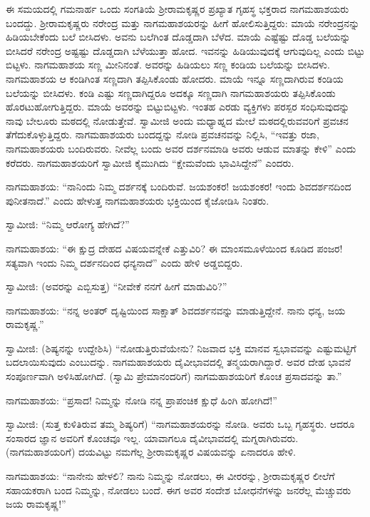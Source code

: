  ಈ ಸಮಯದಲ್ಲಿ ಗಮನಾರ್ಹ ಒಂದು ಸಂಗತಿಯೆ ಶ‍್ರೀರಾಮಕೃಷ್ಣರ ಪ್ರಖ್ಯಾತ ಗೃಹಸ್ಥ ಭಕ್ತರಾದ ನಾಗಮಹಾಶಯರು ಬಂದದ್ದು. ಶ‍್ರೀರಾಮಕೃಷ್ಣರು ನರೇಂದ್ರ ಮತ್ತು ನಾಗಮಹಾಶಯರನ್ನು ಹೀಗೆ ಹೋಲಿಸುತ್ತಿದ್ದರು: ಮಾಯೆ ನರೇಂದ್ರನನ್ನು ಹಿಡಿಯಬೇಕೆಂದು ಬಲೆ ಬೀಸಿದಳು. ಅವನು ಬಲೆಗಿಂತ ದೊಡ್ಡದಾಗಿ ಬೆಳೆದ. ಮಾಯೆ ಎಷ್ಟೆಷ್ಟು ದೊಡ್ಡ ಬಲೆಯನ್ನು ಬೀಸಿದರೆ ನರೇಂದ್ರ ಅಷ್ಟಷ್ಟು ದೊಡ್ಡದಾಗಿ ಬೆಳೆಯುತ್ತಾ ಹೋದ. ಇವನನ್ನು ಹಿಡಿಯುವುದಕ್ಕೆ ಆಗುವುದಿಲ್ಲ ಎಂದು ಬಿಟ್ಟು ಬಿಟ್ಟಳು. ನಾಗಮಹಾಶಯ ಸಣ್ಣ ಮೀನಿನಂತೆ. ಅವರನ್ನು ಹಿಡಿಯಲು ಸಣ್ಣ ಕಂಡಿಯ ಬಲೆಯನ್ನು ಬೀಸಿದಳು. ನಾಗಮಹಾಶಯ ಆ ಕಂಡಿಗಿಂತ ಸಣ್ಣದಾಗಿ ತಪ್ಪಿಸಿಕೊಂಡು ಹೋದರು. ಮಾಯೆ ಇನ್ನೂ ಸಣ್ಣದಾಗಿರುವ ಕಂಡಿಯ ಬಲೆಯನ್ನು ಬೀಸಿದಳು. ಕಂಡಿ ಎಷ್ಟು ಸಣ್ಣದಾಗಿದ್ದರೂ ಅದಕ್ಕೂ ಸಣ್ಣದಾಗಿ ನಾಗಮಹಾಶಯರು ತಪ್ಪಿಸಿಕೊಂಡು ಹೊರಟುಹೋಗುತ್ತಿದ್ದರು. ಮಾಯೆ ಅವರನ್ನು ಬಿಟ್ಟುಬಿಟ್ಟಳು. ಇಂತಹ ಎರಡು ವ್ಯಕ್ತಿಗಳು ಪರಸ್ಪರ ಸಂಧಿಸುವುದನ್ನು ನಾವು ಬೇಲೂರು ಮಠದಲ್ಲಿ ನೋಡುತ್ತೇವೆ. ಸ್ವಾಮೀಜಿ ಅಂದು ಮಧ್ಯಾಹ್ನದ ಮೇಲೆ ಮಠದಲ್ಲಿರುವವರಿಗೆ ಪ್ರವಚನ ತೆಗೆದುಕೊಳ್ಳುತ್ತಿದ್ದರು. ನಾಗಮಹಾಶಯರು ಬಂದದ್ದನ್ನು ನೋಡಿ ಪ್ರವಚನವನ್ನು ನಿಲ್ಲಿಸಿ, “ಇವತ್ತು ರಜಾ, ನಾಗಮಹಾಶಯರು ಬಂದಿರುವರು. ನೀವೆಲ್ಲ ಬಂದು ಅವರ ದರ್ಶನಮಾಡಿ ಅವರು ಆಡುವ ಮಾತನ್ನು ಕೇಳಿ” ಎಂದು ಕರೆದರು. ನಾಗಮಹಾಶಯರಿಗೆ ಸ್ವಾಮೀಜಿ ಕೈಮುಗಿದು “ಕ್ಷೇಮವೆಂದು ಭಾವಿಸಿದ್ದೇನೆ” ಎಂದರು. 

 ನಾಗಮಹಾಶಯ: “ನಾನಿಂದು ನಿಮ್ಮ ದರ್ಶನಕ್ಕೆ ಬಂದಿರುವೆ. ಜಯಶಂಕರ! ಜಯಶಂಕರ! ಇಂದು ಶಿವದರ್ಶನದಿಂದ ಪುನೀತನಾದೆ.” ಎಂದು ಹೇಳುತ್ತ ನಾಗಮಹಾಶಯರು ಭಕ್ತಿಯಿಂದ ಕೈಜೋಡಿಸಿ ನಿಂತರು. 

 ಸ್ವಾಮೀಜಿ: “ನಿಮ್ಮ ಆರೋಗ್ಯ ಹೇಗಿದೆ?” 

 ನಾಗಮಹಾಶಯ: “ಈ ಕ್ಷುದ್ರ ದೇಹದ ವಿಷಯವನ್ನೇಕೆ ಎತ್ತುವಿರಿ? ಈ ಮಾಂಸಮೂಳೆಯಿಂದ ಕೂಡಿದ ಪಂಜರ! ಸತ್ಯವಾಗಿ ಇಂದು ನಿಮ್ಮ ದರ್ಶನದಿಂದ ಧನ್ಯನಾದೆ” ಎಂದು ಹೇಳಿ ಅಡ್ಡಬಿದ್ದರು. 

 ಸ್ವಾಮೀಜಿ: (ಅವರನ್ನು ಎಬ್ಬಿಸುತ್ತ) “ನೀವೇಕೆ ನನಗೆ ಹೀಗೆ ಮಾಡುವಿರಿ?” 

 ನಾಗಮಹಾಶಯ: “ನನ್ನ ಅಂತರ್ ದೃಷ್ಟಿಯಿಂದ ಸಾಕ್ಷಾತ್ ಶಿವದರ್ಶನವನ್ನು ಮಾಡುತ್ತಿದ್ದೇನೆ. ನಾನು ಧನ್ಯ, ಜಯ ರಾಮಕೃಷ್ಣ.” 

 ಸ್ವಾಮೀಜಿ: (ಶಿಷ್ಯನನ್ನು ಉದ್ದೇಶಿಸಿ) “ನೋಡುತ್ತಿರುವೆಯೇನು? ನಿಜವಾದ ಭಕ್ತಿ ಮಾನವ ಸ್ವಭಾವವನ್ನು ಎಷ್ಟುಮಟ್ಟಿಗೆ ಬದಲಾಯಿಸುವುದು ಎಂಬುದನ್ನು. ನಾಗಮಹಾಶಯರು ದೈವೀಭಾವದಲ್ಲಿ ತನ್ಮಯರಾಗಿದ್ದಾರೆ. ಅವರ ದೇಹ ಭಾವನೆ ಸಂಪೂರ್ಣವಾಗಿ ಅಳಿಸಿಹೋಗಿದೆ. (ಸ್ವಾಮಿ ಪ್ರೇಮಾನಂದರಿಗೆ) ನಾಗಮಹಾಶಯರಿಗೆ ಕೊಂಚ ಪ್ರಸಾದವನ್ನು ತಾ.” 

 ನಾಗಮಹಾಶಯ: “ಪ್ರಸಾದ! ನಿಮ್ಮನ್ನು ನೋಡಿ ನನ್ನ ಪ್ರಾಪಂಚಿಕ ಕ್ಷುಧೆ ಹಿಂಗಿ ಹೋಗಿದೆ!” 

 ಸ್ವಾಮೀಜಿ: (ಸುತ್ತ ಕುಳಿತಿರುವ ತಮ್ಮ ಶಿಷ್ಯರಿಗೆ) “ನಾಗಮಹಾಶಯರನ್ನು ನೋಡಿ. ಅವರು ಒಬ್ಬ ಗೃಹಸ್ಥರು. ಆದರೂ ಸಂಸಾರದ ಜ್ಞಾನ ಅವರಿಗೆ ಕೊಂಚವೂ ಇಲ್ಲ. ಯಾವಾಗಲೂ ದೈವೀಭಾವದಲ್ಲಿ ಮಗ್ನರಾಗಿರುವರು. (ನಾಗಮಹಾಶಯರಿಗೆ) ದಯವಿಟ್ಟು ನಮಗೆಲ್ಲ ಶ‍್ರೀರಾಮಕೃಷ್ಣರ ವಿಷಯವನ್ನು ಏನಾದರೂ ಹೇಳಿ. 

 ನಾಗಮಹಾಶಯ: “ನಾನೇನು ಹೇಳಲಿ? ನಾನು ನಿಮ್ಮನ್ನು ನೋಡಲು, ಈ ವೀರರನ್ನು, ಶ‍್ರೀರಾಮಕೃಷ್ಣರ ಲೀಲೆಗೆ ಸಹಾಯಕರಾಗಿ ಬಂದ ನಿಮ್ಮನ್ನು, ನೋಡಲು ಬಂದೆ. ಈಗ ಅವರ ಸಂದೇಶ ಬೋಧನೆಗಳನ್ನು ಜನರೆಲ್ಲ ಮೆಚ್ಚುವರು ಜಯ ರಾಮಕೃಷ್ಣ!” 

